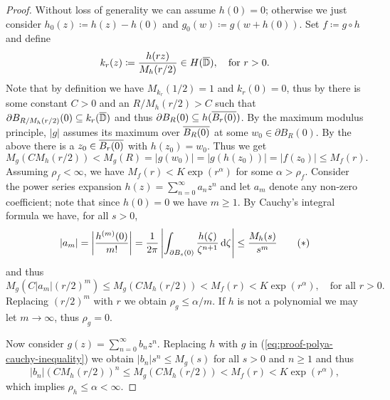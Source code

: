 \begin{proof}
    Without loss of generality we can assume $h(0) = 0$; otherwise we just consider $h_0(z) \coloneqq h(z) - h(0)$ and $g_0(w) \coloneqq g(w + h(0))$. Set $f \coloneqq g \circ h$ and define
    \begin{equation*}
        k_r(z) \coloneqq \frac{h(rz)}{M_h(r / 2)} \in H(\overline{\mathbb{D}}), \quad \textrm{for } r > 0.
    \end{equation*}
    Note that by definition we have $M_{k_r}(1/2) = 1$ and $k_r(0) = 0$, thus by  there is some constant $C > 0$ and an $R / M_h(r/2) > C$ such that $\partial B_{R / M_h(r/2)}(0) \subseteq k_r(\overline{\mathbb{D}})$ and thus $\partial B_R(0) \subseteq h(\overline{B_r(0)})$. By the maximum modulus principle, $\vert g \vert$ assumes its maximum over $\overline{B_R(0)}$ at some $w_0 \in \partial B_R(0)$. By the above there is a $z_0 \in \overline{B_r(0)}$ with $h(z_0) = w_0$. Thus we get
    \begin{equation*}
        M_g(C M_h(r / 2)) < M_g(R) = \vert g(w_0) \vert = \vert g(h(z_0)) \vert = \vert f(z_0) \vert \leq M_f(r).
    \end{equation*}
    Assuming $\rho_f < \infty$, we have $M_f(r) < K \exp(r^\alpha)$ for some $\alpha > \rho_f$. Consider the power series expansion $h(z) = \sum_{n=0}^\infty a_n z^n$ and let $a_m$ denote any non-zero coefficient; note that since $h(0) = 0$ we have $m \geq 1$. By Cauchy's integral formula we have, for all $s > 0$,
    \begin{equation*} \label{eq:proof-polya-cauchy-inequality}
        \vert a_m \vert = \left\vert \frac{h^{(m)}(0)}{m!} \right\vert = \frac{1}{2\pi} \left\vert \int_{\partial B_{s}(0)} \frac{h(\zeta)}{\zeta^{n+1}} \mathop{}\!\mathrm{d} \zeta \right\vert \leq \frac{M_h(s)}{s^m} \tag{\textasteriskcentered}
    \end{equation*}
    and thus
    \begin{equation*}
        M_g(C \vert a_m \vert (r/2)^m) \leq M_g(C M_h(r/2)) < M_f(r) < K \exp(r^\alpha), \quad \textrm{for all } r > 0.
    \end{equation*}
    Replacing $(r/2)^m$ with $r$ we obtain $\rho_g \leq \alpha / m $. If $h$ is not a polynomial we may let $m \to \infty$, thus $\rho_g = 0$.

    Now consider $g(z) = \sum_{n=0}^\infty b_n z^n$. Replacing $h$ with $g$ in (\ref{eq:proof-polya-cauchy-inequality}) we obtain $\vert b_n \vert s^n \leq M_g(s)$ for all $s > 0$ and $n \geq 1$ and thus
    \begin{equation*}
        \vert b_n \vert (C M_h(r/2))^n \leq M_g(C M_h(r/2)) < M_f(r) < K \exp(r^\alpha),
    \end{equation*}
    which implies $\rho_h \leq \alpha < \infty$.
\end{proof}


